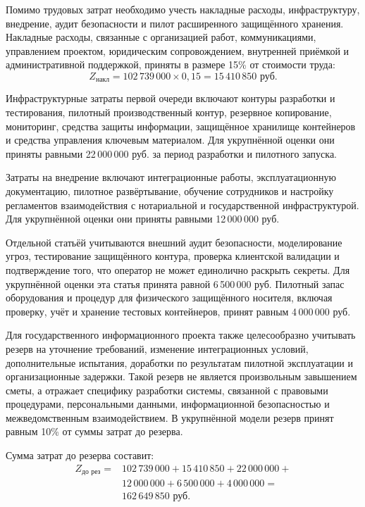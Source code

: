 Помимо трудовых затрат необходимо учесть накладные расходы, инфраструктуру, внедрение, аудит безопасности и пилот расширенного защищённого хранения. Накладные расходы, связанные с организацией работ, коммуникациями, управлением проектом, юридическим сопровождением, внутренней приёмкой и административной поддержкой, приняты в размере 15\% от стоимости труда:
\begin{equation}
Z_{\text{накл}} = 102\,739\,000 \times 0{,}15 = 15\,410\,850 \text{ руб.}
\label{eq:overhead-cost}
\end{equation}

Инфраструктурные затраты первой очереди включают контуры разработки и тестирования, пилотный производственный контур, резервное копирование, мониторинг, средства защиты информации, защищённое хранилище контейнеров и средства управления ключевым материалом. Для укрупнённой оценки они приняты равными 22\,000\,000 руб. за период разработки и пилотного запуска.

Затраты на внедрение включают интеграционные работы, эксплуатационную документацию, пилотное развёртывание, обучение сотрудников и настройку регламентов взаимодействия с нотариальной и государственной инфраструктурой. Для укрупнённой оценки они приняты равными 12\,000\,000 руб.

Отдельной статьёй учитываются внешний аудит безопасности, моделирование угроз, тестирование защищённого контура, проверка клиентской валидации и подтверждение того, что оператор не может единолично раскрыть секреты. Для укрупнённой оценки эта статья принята равной 6\,500\,000 руб. Пилотный запас оборудования и процедур для физического защищённого носителя, включая проверку, учёт и хранение тестовых контейнеров, принят равным 4\,000\,000 руб.

Для государственного информационного проекта также целесообразно учитывать резерв на уточнение требований, изменение интеграционных условий, дополнительные испытания, доработки по результатам пилотной эксплуатации и организационные задержки. Такой резерв не является произвольным завышением сметы, а отражает специфику разработки системы, связанной с правовыми процедурами, персональными данными, информационной безопасностью и межведомственным взаимодействием. В укрупнённой модели резерв принят равным 10\% от суммы затрат до резерва.

Сумма затрат до резерва составит:
\begin{equation}
\begin{aligned}
Z_{\text{до рез}} ={}& 102\,739\,000 + 15\,410\,850 + 22\,000\,000 +{}\\
& 12\,000\,000 + 6\,500\,000 + 4\,000\,000 ={}\\
& 162\,649\,850 \text{ руб.}
\end{aligned}
\label{eq:cost-before-reserve}
\end{equation}

